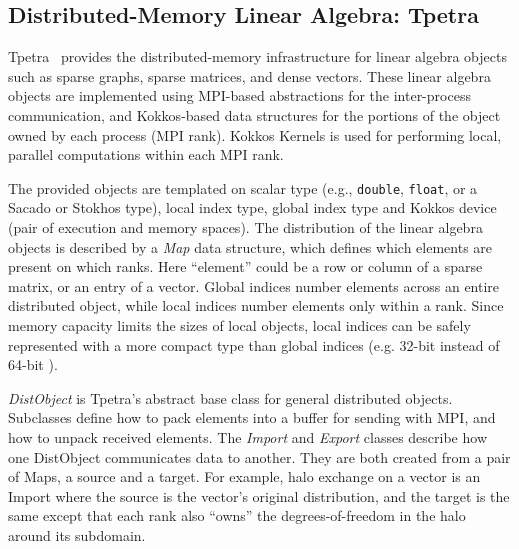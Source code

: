 \subsection{Distributed-Memory Linear Algebra: Tpetra}\label{subsec:tpetra}
Tpetra~\cite{Baker2012,hoemmen2015tpetra} provides the distributed-memory
infrastructure for linear algebra objects such as sparse graphs,
sparse matrices, and dense vectors. These linear algebra objects are
implemented using MPI-based abstractions for the inter-process communication,
and Kokkos-based data structures for the portions of the object
owned by each process (MPI rank). Kokkos Kernels is used for
performing local, parallel computations within each MPI rank.

The provided objects are templated on scalar type (e.g., \texttt{double}, \texttt{float}, or a Sacado or Stokhos type), local index type, global index type and Kokkos device (pair of execution and memory spaces).
The distribution of the linear algebra objects is described by a \emph{Map} data structure, which defines which elements are present on which ranks.
Here ``element'' could be a row or column of a sparse matrix, or an entry of a vector.
Global indices number elements across an entire distributed object, while local indices number elements only within a rank.
Since memory capacity limits the sizes of local objects, local indices can be safely represented with a more compact type than global indices (e.g. 32-bit  instead of 64-bit ).

\emph{DistObject} is Tpetra's abstract base class for general distributed objects.
Subclasses define how to pack elements into a buffer for sending with MPI, and how to unpack received elements.
The \emph{Import} and \emph{Export} classes describe how one DistObject communicates data to another.
They are both created from a pair of Maps, a source and a target. For example, halo exchange on a vector is an Import where
the source is the vector's original distribution, and the target is the same except that each rank
also ``owns'' the degrees-of-freedom in the halo around its subdomain.

